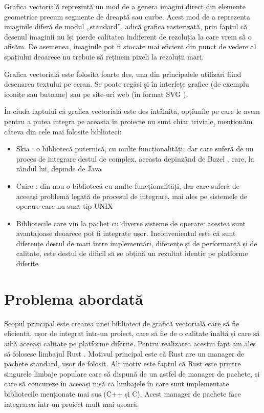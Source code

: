 \documentclass[a4paper, 12pt]{report}
\begin{document}
Grafica vectorială \cite{vector_graphics_wikipedia} reprezintă un mod de a genera imagini
direct din elemente geometrice precum segmente de dreaptă sau curbe. Acest mod de a reprezenta
imaginile diferă de modul „standard”, adică grafica rasterizată, prin faptul că desenul imaginii
nu își pierde calitatea indiferent de rezoluția la care vrem să o afișăm. De asemenea, imaginile
pot fi stocate mai eficient din punct de vedere al spațiului deoarece nu trebuie să reținem pixeli
la rezoluții mari.

Grafica vectorială este folosită foarte des, una din principalele utilizări fiind desenarea textului
pe ecran. Se poate regăsi și în interfețe grafice (de exemplu iconițe sau butoane) sau pe site-uri
web (în format SVG \cite{svg_standard}).

În ciuda faptului că grafica vectorială este des întâlnită, opțiunile pe care le avem pentru a putea
integra pe aceasta în proiecte nu sunt chiar triviale, menționăm câteva din cele mai folosite biblioteci:
\begin{itemize}
    \item{Skia \cite{skia_library}: o bibliotecă puternică, cu multe funcționalități, dar care suferă
                de un proces de integrare destul de complex, aceasta depinzând de Bazel \cite{bazel_build_system},
                care, la rândul lui, depinde de Java \cite{java_programming_language}}
    \item{Cairo \cite{cairo_library}: din nou o bibliotecă cu multe funcționalități, dar care suferă de aceeași
                problemă legată de procesul de integrare, mai ales pe sistemele de operare care nu sunt tip UNIX \cite{unix}}
    \item{Bibliotecile care vin la pachet cu diverse sisteme de operare: acestea sunt avantajoase deoarece pot fi
                integrate ușor. Inconvenientul este că sunt diferențe destul de mari între implementări, diferențe și de
                performanță și de calitate, este destul de dificil să se obțină un rezultat identic pe platforme diferite}
\end{itemize}

\section{Problema abordată}

Scopul principal este crearea unei biblioteci de grafică vectorială care să fie eficientă, ușor de integrat într-un proiect,
care să fie de o calitate înaltă și care să aibă aceeași calitate pe platforme diferite.
Pentru realizarea acestui fapt am ales să folosesc limbajul Rust \cite{rust_lang}. Motivul principal este că Rust are un manager
de pachete standard, ușor de folosit. Alt motiv este faptul că Rust este printre singurele limbaje populare care să
dispună de un astfel de manager de pachete, și care să concureze în aceeași nișă ca limbajele în care sunt implementate
bibliotecile menționate mai sus (C++ și C). Acest manager de pachete face integrarea într-un proiect mult mai ușoară.
\end{document}

